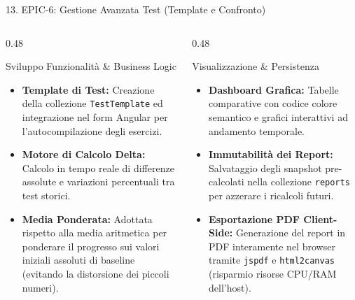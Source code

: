 \documentclass[aspectratio=169, 10pt]{beamer}
\begin{document}
\begin{frame}{13. EPIC-6: Gestione Avanzata Test (Template e Confronto)}
  \begin{columns}
    \begin{column}{0.48\textwidth}
      \begin{block}{Sviluppo Funzionalità \& Business Logic}
        \begin{itemize}
          \item \textbf{Template di Test:} Creazione della collezione \texttt{TestTemplate} ed integrazione nel form Angular per l'autocompilazione degli esercizi.
          \item \textbf{Motore di Calcolo Delta:} Calcolo in tempo reale di differenze assolute e variazioni percentuali tra test storici.
          \item \textbf{Media Ponderata:} Adottata rispetto alla media aritmetica per ponderare il progresso sui valori iniziali assoluti di baseline (evitando la distorsione dei piccoli numeri).
        \end{itemize}
      \end{block}
    \end{column}
    \begin{column}{0.48\textwidth}
      \begin{block}{Visualizzazione \& Persistenza}
        \begin{itemize}
          \item \textbf{Dashboard Grafica:} Tabelle comparative con codice colore semantico e grafici interattivi ad andamento temporale.
          \item \textbf{Immutabilità dei Report:} Salvataggio degli snapshot pre-calcolati nella collezione \texttt{reports} per azzerare i ricalcoli futuri.
          \item \textbf{Esportazione PDF Client-Side:} Generazione del report in PDF interamente nel browser tramite \texttt{jspdf} e \texttt{html2canvas} (risparmio risorse CPU/RAM dell'host).
        \end{itemize}
      \end{block}
    \end{column}
  \end{columns}
\end{frame}
\end{document}
